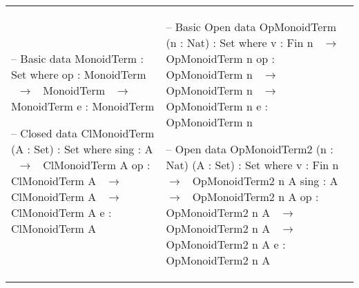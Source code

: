 \footnotesize
\begin{tabular}[t]{p{6.3cm} p{6.3cm}}
\begin{agdacode}
-- Basic 
data MonoidTerm  : Set where
  op  : MonoidTerm ~$\to$~ 
        MonoidTerm ~$\to$~ 
        MonoidTerm
  e   : MonoidTerm   





-- Closed 
data ClMonoidTerm (A  : Set)  
          : Set where
  sing : A ~$\to$~ ClMonoidTerm A
  op   : ClMonoidTerm A ~$\to$~ 
         ClMonoidTerm A ~$\to$~ 
         ClMonoidTerm A
  e    : ClMonoidTerm A
  
  
    
\end{agdacode}
&
\begin{agdacode}
    
-- Basic Open 
data OpMonoidTerm (n  : Nat)  
          : Set where
  v  : Fin n ~$\to$~ OpMonoidTerm n
  op : OpMonoidTerm n ~$\to$~ 
       OpMonoidTerm n ~$\to$~ 
       OpMonoidTerm n 
  e  : OpMonoidTerm n  


-- Open
data OpMonoidTerm2 (n  : Nat) (A  : Set)  
        : Set where
  v : Fin n ~$\to$~ OpMonoidTerm2 n A 
  sing : A ~$\to$~ OpMonoidTerm2 n A 
  op   : OpMonoidTerm2 n A ~$\to$~ 
         OpMonoidTerm2 n A ~$\to$~ 
         OpMonoidTerm2 n A
  e    : OpMonoidTerm2 n A  
\end{agdacode}
\end{tabular}